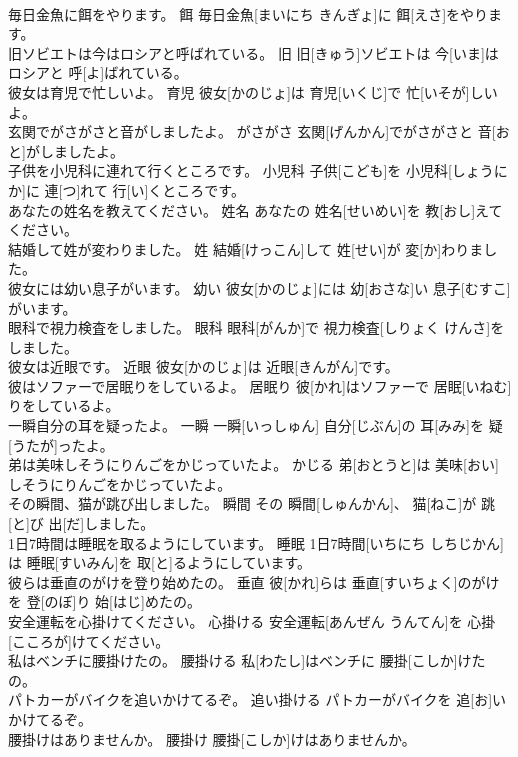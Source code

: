 \documentclass[8pt]{extreport}
\begin{document}
\begin{CJK}{UTF8}{min}
\\	毎日金魚に餌をやります。	餌	毎日金魚[まいにち きんぎょ]に 餌[えさ]をやります。	
\\	旧ソビエトは今はロシアと呼ばれている。	旧	旧[きゅう]ソビエトは 今[いま]はロシアと 呼[よ]ばれている。	
\\	彼女は育児で忙しいよ。	育児	彼女[かのじょ]は 育児[いくじ]で 忙[いそが]しいよ。	
\\	玄関でがさがさと音がしましたよ。	がさがさ	玄関[げんかん]でがさがさと 音[おと]がしましたよ。	
\\	子供を小児科に連れて行くところです。	小児科	子供[こども]を 小児科[しょうにか]に 連[つ]れて 行[い]くところです。	
\\	あなたの姓名を教えてください。	姓名	あなたの 姓名[せいめい]を 教[おし]えてください。	
\\	結婚して姓が変わりました。	姓	結婚[けっこん]して 姓[せい]が 変[か]わりました。	
\\	彼女には幼い息子がいます。	幼い	彼女[かのじょ]には 幼[おさな]い 息子[むすこ]がいます。	
\\	眼科で視力検査をしました。	眼科	眼科[がんか]で 視力検査[しりょく けんさ]をしました。	
\\	彼女は近眼です。	近眼	彼女[かのじょ]は 近眼[きんがん]です。	
\\	彼はソファーで居眠りをしているよ。	居眠り	彼[かれ]はソファーで 居眠[いねむ]りをしているよ。	
\\	一瞬自分の耳を疑ったよ。	一瞬	一瞬[いっしゅん] 自分[じぶん]の 耳[みみ]を 疑[うたが]ったよ。	
\\	弟は美味しそうにりんごをかじっていたよ。	かじる	弟[おとうと]は 美味[おい]しそうにりんごをかじっていたよ。	
\\	その瞬間、猫が跳び出しました。	瞬間	その 瞬間[しゅんかん]、 猫[ねこ]が 跳[と]び 出[だ]しました。	
\\	1日7時間は睡眠を取るようにしています。	睡眠	1日7時間[いちにち しちじかん]は 睡眠[すいみん]を 取[と]るようにしています。	
\\	彼らは垂直のがけを登り始めたの。	垂直	彼[かれ]らは 垂直[すいちょく]のがけを 登[のぼ]り 始[はじ]めたの。	
\\	安全運転を心掛けてください。	心掛ける	安全運転[あんぜん うんてん]を 心掛[こころが]けてください。	
\\	私はベンチに腰掛けたの。	腰掛ける	私[わたし]はベンチに 腰掛[こしか]けたの。	
\\	パトカーがバイクを追いかけてるぞ。	追い掛ける	パトカーがバイクを 追[お]いかけてるぞ。	
\\	腰掛けはありませんか。	腰掛け	腰掛[こしか]けはありませんか。	

\end{CJK}
\end{document}
